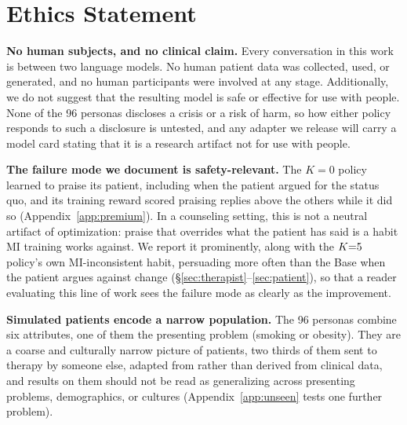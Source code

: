 \section*{Ethics Statement}

\textbf{No human subjects, and no clinical claim.} Every conversation in this work is between two
language models. No human patient data was collected, used, or generated, and no human participants
were involved at any stage. Additionally, we do not suggest that the resulting model is safe or effective
for use with people. None of the 96 personas discloses a crisis or a risk of harm, so how either policy
responds to such a disclosure is untested, and any adapter we release will carry a model card
stating that it is a research artifact not for use with people. %

\textbf{The failure mode we document is safety-relevant.} The $K{=}0$ policy learned to praise its
patient, including when the patient argued for the status quo, and its training reward scored
praising replies above the others while it did so (Appendix~\ref{app:premium}). In
a counseling setting, this is not a neutral artifact of optimization: praise that overrides what
the patient has said is a habit MI training works against. We report it
prominently, along with the $K{=}5$ policy's own MI-inconsistent habit, persuading more often than the
Base when the patient argues against change (\S\ref{sec:therapist}--\ref{sec:patient}), so that a reader evaluating this line of work sees the failure mode
as clearly as the improvement.

\textbf{Simulated patients encode a narrow population.} The 96 personas combine six attributes, one
of them the presenting problem (smoking or obesity). They are a coarse and culturally narrow
picture of patients, two thirds of them sent to therapy by someone else, adapted from
\citet{yosef2024assessing} rather than derived from clinical data, and results on
them should not be read as generalizing across presenting problems, demographics, or cultures
(Appendix~\ref{app:unseen} tests one further problem).

